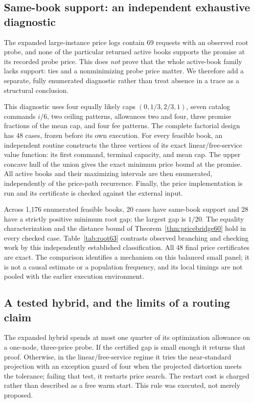 \subsection{Same-book support: an independent exhaustive diagnostic}\label{sec:root63}
The expanded large-instance price logs contain 69 requests with an observed root probe, and none of the particular returned active books supports the promise at its recorded probe price. This does \emph{not} prove that the whole active-book family lacks support: ties and a nonminimizing probe price matter. We therefore add a separate, fully enumerated diagnostic rather than treat absence in a trace as a structural conclusion.

This diagnostic uses four equally likely caps $(0,1/3,2/3,1)$, seven catalog commands $i/6$, two ceiling patterns, allowances two and four, three promise fractions of the mean cap, and four fee patterns. The complete factorial design has 48 cases, frozen before its own execution. For every feasible book, an independent routine constructs the three vertices of its exact linear/free-service value function: its first command, terminal capacity, and mean cap. The upper concave hull of the union gives the exact minimum price bound at the promise. All active books and their maximizing intervals are then enumerated, independently of the price-path recurrence. Finally, the price implementation is run and its certificate is checked against the external input.

Across 1,176 enumerated feasible books, 20 cases have same-book support and 28 have a strictly positive minimum root gap; the largest gap is $1/20$. The equality characterization and the distance bound of Theorem~\ref{thm:pricebridge60} hold in every checked case. Table~\ref{tab:root63} contrasts observed branching and checking work by this independently established classification. All 48 final price certificates are exact. The comparison identifies a mechanism on this balanced small panel; it is not a causal estimate or a population frequency, and its local timings are not pooled with the earlier execution environment.

\subsection{A tested hybrid, and the limits of a routing claim}
The expanded hybrid spends at most one quarter of its optimization allowance on a one-node, three-price probe. If the certified gap is small enough it returns that proof. Otherwise, in the linear/free-service regime it tries the near-standard projection with an exception guard of four when the projected distortion meets the tolerance; failing that test, it restarts price search. The restart cost is charged rather than described as a free warm start. This rule was executed, not merely proposed.

